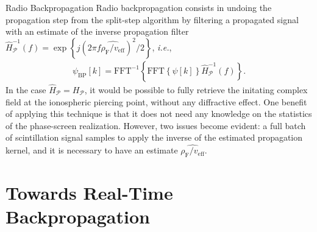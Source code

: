 \documentclass[10pt]{beamer}
\begin{document}
\begin{frame}{Radio Backpropagation}
    Radio backpropagation consists in undoing the propagation step from the split-step algorithm by filtering a propagated signal with an estimate of the inverse propagation filter $\hat{H}_{\mathcal{P}}^{-1} \left( f \right) = \exp \left\{ j\left( 2\pi f \widehat{\rho_{\mathrm{F}} / v_{\mathrm{eff}}} \right)^2 /2 \right\}$, \textit{i.e.},
    \begin{align}
        \psi_{\mathrm{BP}} \left[ k \right] = {\mathrm{FFT}}^{-1} \left\{ \mathrm{FFT}\left\{ \psi \left[ k \right] \right\}\hat{H}_{\mathcal{P}}^{-1} \left( f \right) \right\} \mathrm{.}
    \end{align}
    In the case $\hat{H}_{\mathcal{P}} = H_{\mathcal{P}}$, it would be possible to fully retrieve the initating complex field at the ionospheric piercing point, without any diffractive effect. One benefit of applying this technique is that it does not need any knowledge on the statistics of the phase-screen realization. However, two issues become evident: a full batch of scintillation signal samples to apply the inverse of the estimated propagation kernel, and it is necessary to have an estimate $\widehat{\rho_{\mathrm{F}} / v_{\mathrm{eff}}}$.
\end{frame}

\section{Towards Real-Time Backpropagation}
\end{document}
